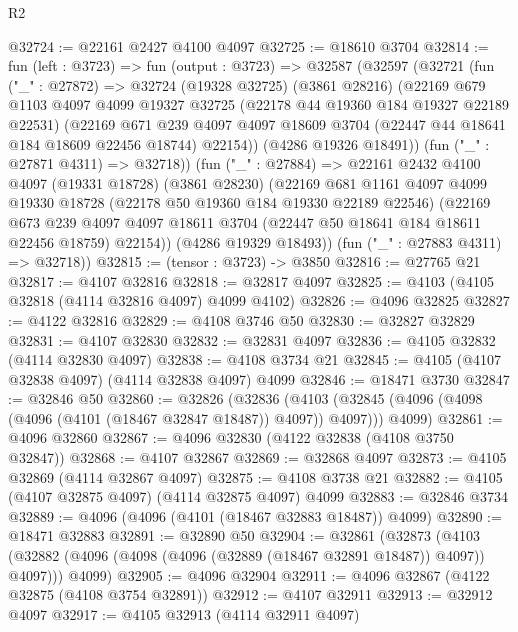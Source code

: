 \begin{lexlean}{R2}
\begin{coremodule}
@32724 := @22161 @2427 @4100 @4097
@32725 := @18610 @3704
@32814 := fun (left : @3723) =>
  fun (output : @3723) =>
  @32587
    (@32597
      (@32721
        (fun ("_" : @27872) =>
        @32724
          (@19328 @32725)
          (@3861 @28216)
          (@22169
            @679
            @1103
            @4097
            @4099
            @19327
            @32725
            (@22178 @44 @19360 @184 @19327 @22189 @22531)
            (@22169
              @671
              @239
              @4097
              @4097
              @18609
              @3704
              (@22447 @44 @18641 @184 @18609 @22456 @18744)
              @22154))
          (@4286 @19326 @18491))
        (fun ("_" : @27871 @4311) => @32718))
      (fun ("_" : @27884) =>
      @22161
        @2432
        @4100
        @4097
        (@19331 @18728)
        (@3861 @28230)
        (@22169
          @681
          @1161
          @4097
          @4099
          @19330
          @18728
          (@22178 @50 @19360 @184 @19330 @22189 @22546)
          (@22169
            @673
            @239
            @4097
            @4097
            @18611
            @3704
            (@22447 @50 @18641 @184 @18611 @22456 @18759)
            @22154))
        (@4286 @19329 @18493))
      (fun ("_" : @27883 @4311) => @32718))
@32815 := (tensor : @3723) -> @3850
@32816 := @27765 @21
@32817 := @4107 @32816
@32818 := @32817 @4097
@32825 := @4103 (@4105 @32818 (@4114 @32816 @4097) @4099 @4102)
@32826 := @4096 @32825
@32827 := @4122 @32816
@32829 := @4108 @3746 @50
@32830 := @32827 @32829
@32831 := @4107 @32830
@32832 := @32831 @4097
@32836 := @4105 @32832 (@4114 @32830 @4097)
@32838 := @4108 @3734 @21
@32845 := @4105 (@4107 @32838 @4097) (@4114 @32838 @4097) @4099
@32846 := @18471 @3730
@32847 := @32846 @50
@32860 := @32826
    (@32836
      (@4103 (@32845 (@4096 (@4098 (@4096 (@4101 (@18467 @32847 @18487)) @4097)) @4097)))
      @4099)
@32861 := @4096 @32860
@32867 := @4096 @32830 (@4122 @32838 (@4108 @3750 @32847))
@32868 := @4107 @32867
@32869 := @32868 @4097
@32873 := @4105 @32869 (@4114 @32867 @4097)
@32875 := @4108 @3738 @21
@32882 := @4105 (@4107 @32875 @4097) (@4114 @32875 @4097) @4099
@32883 := @32846 @3734
@32889 := @4096 (@4096 (@4101 (@18467 @32883 @18487)) @4099)
@32890 := @18471 @32883
@32891 := @32890 @50
@32904 := @32861
    (@32873
      (@4103 (@32882 (@4096 (@4098 (@4096 (@32889 (@18467 @32891 @18487)) @4097)) @4097)))
      @4099)
@32905 := @4096 @32904
@32911 := @4096 @32867 (@4122 @32875 (@4108 @3754 @32891))
@32912 := @4107 @32911
@32913 := @32912 @4097
@32917 := @4105 @32913 (@4114 @32911 @4097)

\end{coremodule}
\end{lexlean}
